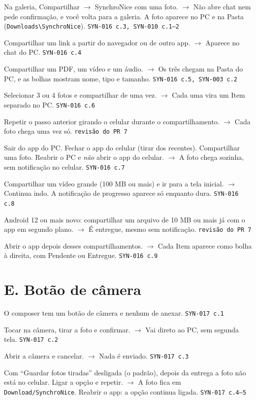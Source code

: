 \documentclass[11pt,a4paper]{article}
\newcommand{\letra}{P}
\newcommand{\secao}[2]{\renewcommand{\letra}{#1}\section*{#1. #2}\addcontentsline{toc}{section}{#1. #2}}
\newcommand{\fonte}[1]{\hfill{\small\color{fonte}\texttt{#1}}}
\begin{document}
\begin{passos}
  \item Na galeria, Compartilhar $\rightarrow$ SynchroNice com uma foto.
        $\rightarrow$ Não abre chat nem pede confirmação, e você volta para a
        galeria. A foto aparece no PC e na Pasta
        (\texttt{Downloads\textbackslash SynchroNice}). \fonte{SYN-016 c.3,
        SYN-010 c.1--2}
  \item Compartilhar um link a partir do navegador ou de outro app.
        $\rightarrow$ Aparece no chat do PC. \fonte{SYN-016 c.4}
  \item Compartilhar um PDF, um vídeo e um áudio. $\rightarrow$ Os três chegam
        na Pasta do PC, e as bolhas mostram nome, tipo e tamanho.
        \fonte{SYN-016 c.5, SYN-003 c.2}
  \item Selecionar 3 ou 4 fotos e compartilhar de uma vez. $\rightarrow$ Cada
        uma vira um Item separado no PC. \fonte{SYN-016 c.6}
  \item Repetir o passo anterior girando o celular durante o compartilhamento.
        $\rightarrow$ Cada foto chega uma vez só. \fonte{revisão do PR 7}
  \item Sair do app do PC. Fechar o app do celular (tirar dos recentes).
        Compartilhar uma foto. Reabrir o PC e \emph{não} abrir o app do
        celular. $\rightarrow$ A foto chega sozinha, sem notificação no
        celular. \fonte{SYN-016 c.7}
  \item Compartilhar um vídeo grande (100 MB ou mais) e ir para a tela
        inicial. $\rightarrow$ Continua indo. A notificação de progresso
        aparece só enquanto dura. \fonte{SYN-016 c.8}
  \item Android 12 ou mais novo: compartilhar um arquivo de 10 MB ou mais já
        com o app em segundo plano. $\rightarrow$ É entregue, mesmo sem
        notificação. \fonte{revisão do PR 7}
  \item Abrir o app depois desses compartilhamentos. $\rightarrow$ Cada Item
        aparece como bolha à direita, com Pendente ou Entregue.
        \fonte{SYN-016 c.9}
\end{passos}

\secao{E}{Botão de câmera}

\begin{passos}
  \item O composer tem um botão de câmera e nenhum de anexar.
        \fonte{SYN-017 c.1}
  \item Tocar na câmera, tirar a foto e confirmar. $\rightarrow$ Vai direto ao
        PC, sem segunda tela. \fonte{SYN-017 c.2}
  \item Abrir a câmera e cancelar. $\rightarrow$ Nada é enviado.
        \fonte{SYN-017 c.3}
  \item Com ``Guardar fotos tiradas'' desligada (o padrão), depois da entrega
        a foto não está no celular. Ligar a opção e repetir. $\rightarrow$ A
        foto fica em \texttt{Download/SynchroNice}. Reabrir o app: a opção
        continua ligada. \fonte{SYN-017 c.4--5}
\end{passos}
\end{document}
